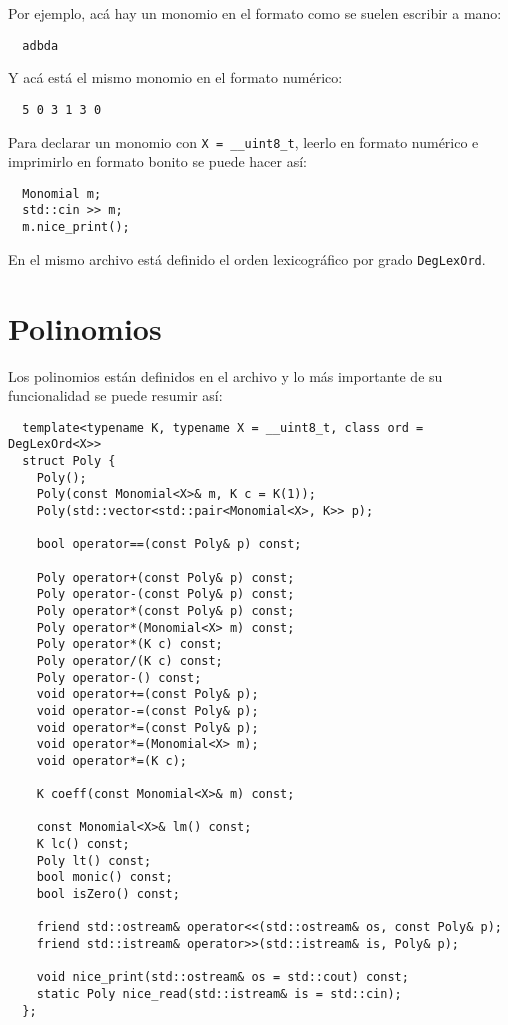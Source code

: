 \documentclass[12pt]{report}
\theoremstyle{customstyle}
\theoremstyle{factstyle}
\begin{document}
Por ejemplo, acá hay un monomio en el formato como se suelen escribir a mano:

\begin{lstlisting}
  adbda
\end{lstlisting}

\noindent Y acá está el mismo monomio en el formato numérico:

\begin{lstlisting}
  5 0 3 1 3 0
\end{lstlisting}

Para declarar un monomio con \texttt{X = \_\_uint8\_t}, leerlo en formato numérico e imprimirlo en formato bonito se puede hacer así:

\begin{verbatim}
  Monomial m;
  std::cin >> m;
  m.nice_print();
\end{verbatim}

En el mismo archivo  está definido el orden lexicográfico por grado \texttt{DegLexOrd}.

\section{Polinomios}

Los polinomios están definidos en el archivo  y lo más importante de su funcionalidad se puede resumir así:

\begin{verbatim}
  template<typename K, typename X = __uint8_t, class ord = DegLexOrd<X>>
  struct Poly {
    Poly();
    Poly(const Monomial<X>& m, K c = K(1));
    Poly(std::vector<std::pair<Monomial<X>, K>> p);

    bool operator==(const Poly& p) const;

    Poly operator+(const Poly& p) const;
    Poly operator-(const Poly& p) const;
    Poly operator*(const Poly& p) const;
    Poly operator*(Monomial<X> m) const;
    Poly operator*(K c) const;
    Poly operator/(K c) const;
    Poly operator-() const;
    void operator+=(const Poly& p);
    void operator-=(const Poly& p);
    void operator*=(const Poly& p);
    void operator*=(Monomial<X> m);
    void operator*=(K c);

    K coeff(const Monomial<X>& m) const;

    const Monomial<X>& lm() const;
    K lc() const;
    Poly lt() const;
    bool monic() const;
    bool isZero() const;

    friend std::ostream& operator<<(std::ostream& os, const Poly& p);
    friend std::istream& operator>>(std::istream& is, Poly& p);

    void nice_print(std::ostream& os = std::cout) const;
    static Poly nice_read(std::istream& is = std::cin);
  };
\end{verbatim}
\end{document}
